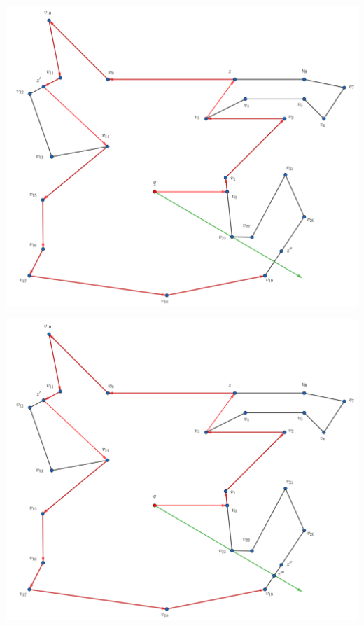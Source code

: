 \begin{frame}
  \centering \includegraphics[width=0.70 \paperwidth]{images/Ejecucion/e36.png}
\end{frame}

\begin{frame}
  \centering \includegraphics[width=0.70 \paperwidth]{images/Ejecucion/e37.png}
\end{frame}


